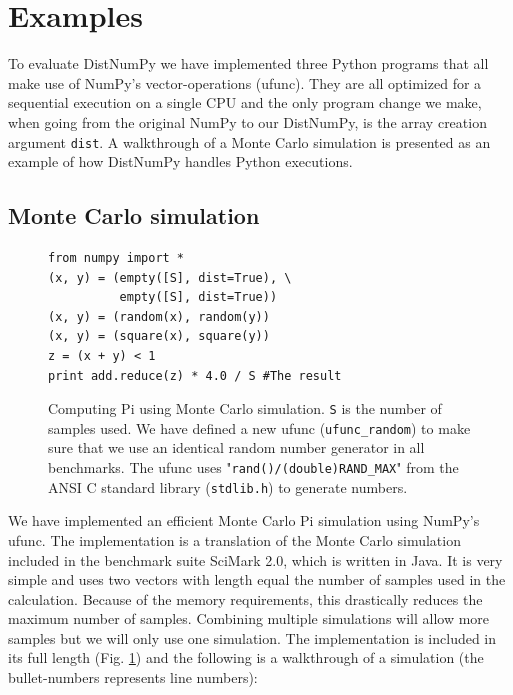\documentclass{sigplanconf}
\begin{document}
\section{Examples}\label{sec:examples}
To evaluate DistNumPy we have implemented three Python programs that all make use of NumPy's vector-operations (ufunc). They are all optimized for a sequential execution on a single CPU and the only program change we make, when going from the original NumPy to our DistNumPy, is the array creation argument \texttt{dist}. 
A walkthrough of a Monte Carlo simulation is presented as an example of how DistNumPy handles Python executions.


\subsection{Monte Carlo simulation}
\begin{figure}
\begin{lstlisting}
from numpy import *
(x, y) = (empty([S], dist=True), \
          empty([S], dist=True))
(x, y) = (random(x), random(y))
(x, y) = (square(x), square(y))
z = (x + y) < 1
print add.reduce(z) * 4.0 / S #The result
\end{lstlisting}
 \caption{Computing Pi using Monte Carlo simulation. \texttt{S} is the number of samples used. We have defined a new ufunc (\texttt{ufunc\_random}) to make sure that we use an identical random number generator in all benchmarks. The ufunc uses "\texttt{rand()/(double)RAND\_MAX}" from the ANSI C standard library (\texttt{stdlib.h}) to generate numbers.}
 \label{lst:montecarlo}
\end{figure}

We have implemented an efficient Monte Carlo Pi simulation using NumPy's ufunc. The implementation is a translation of the Monte Carlo simulation included in the benchmark suite SciMark 2.0\cite{SciMark}, which is written in Java. It is very simple and uses two vectors with length equal the number of samples used in the calculation. Because of the memory requirements, this drastically reduces the maximum number of samples. Combining multiple simulations will allow more samples but we will only use one simulation. The implementation is included in its full length (Fig. \ref{lst:montecarlo}) and the following is a walkthrough of a simulation (the bullet-numbers represents line numbers):
\end{document}
